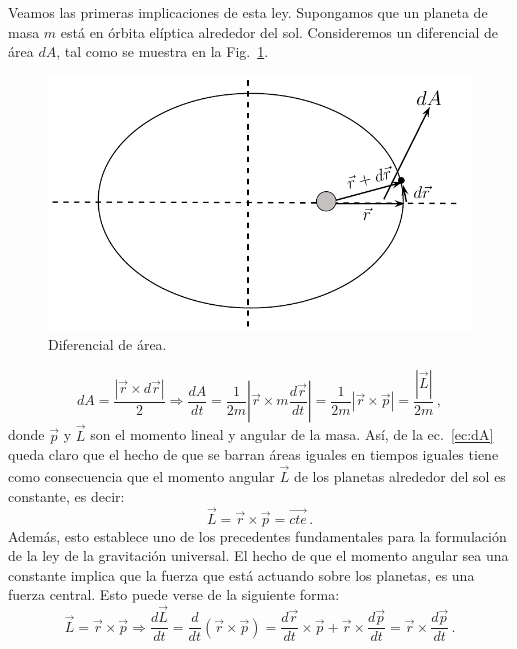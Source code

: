 \begin{enumerate}
Veamos las primeras implicaciones de esta ley. Supongamos que un planeta de masa $m$ está en órbita elíptica alrededor del sol. Consideremos un diferencial de área $dA$, tal como se muestra en la Fig.~\ref{fig:dA}.
\begin{figure}[h]
\begin{center}
\includegraphics[scale=0.7]{gravitacion/g-dA}
\end{center}
\caption{Diferencial de área.}
\label{fig:dA}
\end{figure}
\begin{equation}
dA = \dfrac{|\vec{r} \times d\vec{r}|}{2} 
\Rightarrow \dfrac{dA}{dt} = \dfrac{1}{2m}|\vec{r} \times m \dfrac{d\vec{r}}{dt}| = \dfrac{1}{2m}|\vec{r}\times \vec{p}|=\dfrac{|\vec{L}|}{2m}\,,
\label{ec:dA}
\end{equation}
donde $\vec{p}$ y $\vec{L}$ son el momento lineal y angular de la masa.
Así, de la ec.~\ref{ec:dA} queda claro que el hecho de que se barran áreas iguales en tiempos iguales tiene como consecuencia que el momento angular $\vec{L}$ de los planetas alrededor del sol es constante, es decir:
\begin{equation}
\vec{L}=\vec{r}\times \vec{p}=\vec{cte}\,.
\end{equation}
Además, esto establece uno de los precedentes fundamentales para la formulación de la ley de la gravitación universal. El hecho de que el momento angular sea una constante implica que la fuerza que está actuando sobre los planetas, es una fuerza central. Esto puede verse de la siguiente forma:
\begin{equation}
\vec{L}=\vec{r} \times \vec{p} \Rightarrow \dfrac{d\vec{L}}{dt}=\dfrac{d}{dt}(\vec{r}\times \vec{p}) =\dfrac{d\vec{r}}{dt}\times \vec{p} + \vec{r} \times \dfrac{d\vec{p}}{dt} = \vec{r} \times \dfrac{d\vec{p}}{dt}\,.

\end{equation}
\end{enumerate}
